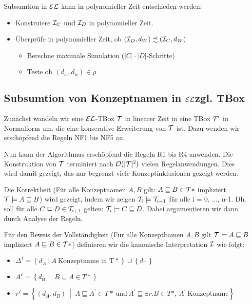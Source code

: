 Subsumtion in $\mathcal{E}\mathcal{L}$ kann in polynomieller Zeit entschieden werden:

\begin{itemize}
	\item Konstruiere $\mathcal{I}_C$ und $\mathcal{I}_D$ in polynomieller Zeit.
	\item Überprüfe in polynomieller Zeit, ob $(\mathcal{I}_D,d_W) \precsim (\mathcal{I}_C,d_W)$
	\begin{itemize}
		\item Berechne maximale Simulation ($|C| \cdot |D|$-Schritte)
		\item Teste ob $(d_w,d_w) \in \rho$
	\end{itemize}
\end{itemize}

\subsection{Subsumtion von Konzeptnamen in \texorpdfstring{$\mathcal{E}\mathcal{L}$} bzgl. TBox}

Zunächst wandeln wir eine $\mathcal{E}\mathcal{L}$-TBox $\mathcal{T}$ in linearer Zeit in eine TBox $\mathcal{T}'$ in Normalform um, die eine konserative Erweiterung von $\mathcal{T}$ ist. Dazu wenden wir erschöpfend die Regeln NF1 bis NF5 an.

Nun kann der Algorithmus erschöpfend die Regeln R1 bis R4 anwenden. Die Konstruktion von $\mathcal{T}$ terminiert nach $\mathcal{O}(|\mathcal{T}|^2)$ vielen Regelanwendungen. Dies wird damit gezeigt, das nur begrenzt viele Konzeptinklusionen gezeigt werden.

Die Korrektheit (Für alle Konzeptnamen $A,B$ gilt: $A \sqsubseteq B \in \mathcal{T}*$ impliziert $\mathcal{T} \models A \sqsubseteq B$) wird gezeigt, indem wir zeigen $\mathcal{T}_i \models \mathcal{T}_{i+1}$ für alle i = 0, ..., n-1. Dh. soll für alle $C \sqsubseteq D \in \mathcal{T}_{i+1}$ gelten: $\mathcal{T}_i \models C \sqsubseteq D$. Dabei argumentieren wir dann durch Analyse der Regeln. 

Für den Beweis der Vollständigkeit (Für alle Konzeptbamen $A,B$ gilt $\mathcal{T} \models A \sqsubseteq B$ impliziert $A \sqsubseteq B \in \mathcal{T} *$) definieren wir die kanonische Interpretation $\mathcal{I}$ wie folgt:

\begin{itemize}
\item
  $\Delta^{I} = \left\{ d_{A}\ |\ A\ \mathrm{\text{Konzeptname\ in\ T}}* \right\} \cup \left\{ d_{\top} \right\}$
\item
  $A^{I} = \left\{ d_{\text{B\ }} \middle| \ B \sqsubseteq A \in T* \right\}$
\item
  $r^{I} = \left\{ \left( d_{A},d_{B} \right)\  \middle| \ A \sqsubseteq A^{'} \in T*\ \mathrm{\text{und}}\ A^{'} \sqsubseteq \exists r.B \in T*,\ A^{'}\ \mathrm{\text{Konzeptname}} \right\}$
\end{itemize}

